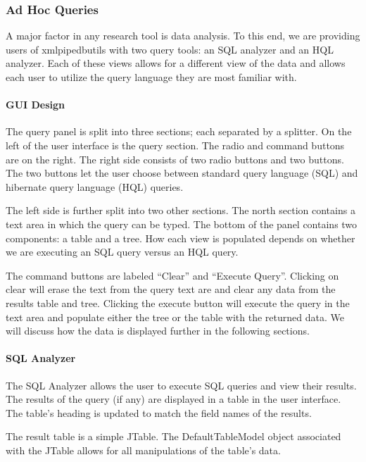 \subsubsection{Ad Hoc Queries}
A major factor in any research tool is data analysis. To this end, we are providing users of xmlpipedbutils with two query tools: an SQL analyzer and an HQL analyzer. Each of these views allows for a different view of the data and allows each user to utilize the query language they are most familiar with.

\paragraph{GUI Design}

The query panel is split into three sections; each separated by a splitter. On the left of the user interface is the query section. The radio and command buttons are on the right. The right side consists of two radio buttons and two buttons. The two buttons let the user choose between standard query language (SQL) and hibernate query language (HQL) queries. 

The left side is further split into two other sections. The north section contains a text area in which the query can be typed. The bottom of the panel contains two components: a table and a tree. How each view is populated depends on whether we are executing an SQL query versus an HQL query.

The command buttons are labeled ``Clear'' and ``Execute Query''. Clicking on clear will erase the text from the query text are and clear any data from the results table and tree. Clicking the execute button will execute the query in the text area and populate either the tree or the table with the returned data. We will discuss how the data is displayed further in the following sections.

\paragraph{SQL Analyzer}

The SQL Analyzer allows the user to execute SQL queries and view their results. The results of the query (if any) are displayed in a table in the user interface. The table's heading is updated to match the field names of the results.

The result table is a simple JTable. The DefaultTableModel object associated with the JTable allows for all manipulations of the table's data.

